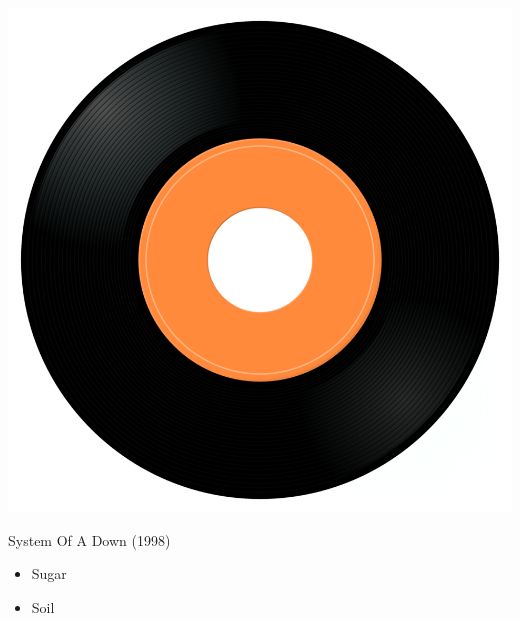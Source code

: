 \begin{minipage}[t]{0.25\textwidth}
\captionsetup{type=figure}
\includegraphics[width=\textwidth]{Images/cover.png}
\caption*{System Of A Down (1998)}
\end{minipage}
\begin{minipage}[t]{0.25\textwidth}\vspace{0pt}
\begin{itemize}[nosep,leftmargin=1em,labelwidth=*,align=left]
	\setlength{\itemsep}{0pt}
	\item Sugar
	\item Soil
\end{itemize}
\end{minipage}
